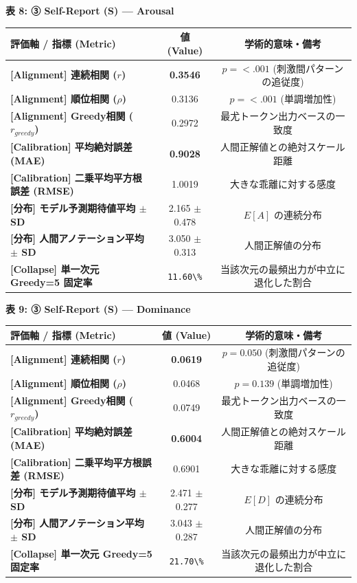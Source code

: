 \textbf{表 8: ③ Self-Report (S) — Arousal}
\begin{center}
\small
\begin{tabular}{lcc}
\toprule
\textbf{評価軸 / 指標 (Metric)} & \textbf{値 (Value)} & \textbf{学術的意味・備考} \\
\midrule
\textbf{[Alignment] 連続相関 ($r$)} & \textbf{0.3546} & $p = <.001 $ (刺激間パターンの追従度) \\
\textbf{[Alignment] 順位相関 ($\rho$)} & 0.3136 & $p = <.001 $ (単調増加性) \\
\textbf{[Alignment] Greedy相関 ($r_{greedy}$)} & 0.2972 & 最尤トークン出力ベースの一致度 \\
\textbf{[Calibration] 平均絶対誤差 (MAE)} & \textbf{0.9028} & 人間正解値との絶対スケール距離 \\
\textbf{[Calibration] 二乗平均平方根誤差 (RMSE)} & 1.0019 & 大きな乖離に対する感度 \\
\textbf{[分布] モデル予測期待値平均 $\pm$ SD} & 2.165 $\pm$ 0.478 & $E[A]$ の連続分布 \\
\textbf{[分布] 人間アノテーション平均 $\pm$ SD} & 3.050 $\pm$ 0.313 & 人間正解値の分布 \\
\textbf{[Collapse] 単一次元 Greedy=5 固定率} & \texttt{11.60\textbackslash{}\%} & 当該次元の最頻出力が中立に退化した割合 \\
\bottomrule
\end{tabular}
\end{center}


\textbf{表 9: ③ Self-Report (S) — Dominance}
\begin{center}
\small
\begin{tabular}{lcc}
\toprule
\textbf{評価軸 / 指標 (Metric)} & \textbf{値 (Value)} & \textbf{学術的意味・備考} \\
\midrule
\textbf{[Alignment] 連続相関 ($r$)} & \textbf{0.0619} & $p = 0.050 $ (刺激間パターンの追従度) \\
\textbf{[Alignment] 順位相関 ($\rho$)} & 0.0468 & $p = 0.139 $ (単調増加性) \\
\textbf{[Alignment] Greedy相関 ($r_{greedy}$)} & 0.0749 & 最尤トークン出力ベースの一致度 \\
\textbf{[Calibration] 平均絶対誤差 (MAE)} & \textbf{0.6004} & 人間正解値との絶対スケール距離 \\
\textbf{[Calibration] 二乗平均平方根誤差 (RMSE)} & 0.6901 & 大きな乖離に対する感度 \\
\textbf{[分布] モデル予測期待値平均 $\pm$ SD} & 2.471 $\pm$ 0.277 & $E[D]$ の連続分布 \\
\textbf{[分布] 人間アノテーション平均 $\pm$ SD} & 3.043 $\pm$ 0.287 & 人間正解値の分布 \\
\textbf{[Collapse] 単一次元 Greedy=5 固定率} & \texttt{21.70\textbackslash{}\%} & 当該次元の最頻出力が中立に退化した割合 \\
\bottomrule
\end{tabular}
\end{center}


